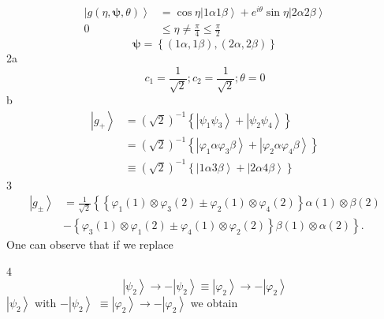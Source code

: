 \documentclass[aps,preprint]{revtex4}%
\begin{document}
\begin{align*}
\left\vert g\left(  \eta,\mathbf{\psi,}\theta\right)  \right\rangle  &
=\cos\eta\left\vert 1\alpha1\beta\right\rangle +e^{i\theta}\sin\eta\left\vert
2\alpha2\beta\right\rangle \\
0  &  \leq\eta\neq\frac{\pi}{4}\leq\frac{\pi}{2}%
\end{align*}%
\[
\mathbf{\psi}=\left\{  \left(  1\alpha,1\beta\right)  ,\left(  2\alpha
,2\beta\right)  \right\}
\]
2a%
\[
c_{1}=\frac{1}{\sqrt{2}};c_{2}=\frac{1}{\sqrt{2}};\theta=0
\]
b%
\begin{align*}
\left\vert g_{+}\right\rangle  &  =\left(  \sqrt{2}\right)  ^{-1}\left\{
\left\vert \psi_{1}\psi_{3}\right\rangle +\left\vert \psi_{2}\psi
_{4}\right\rangle \right\} \\
&  =\left(  \sqrt{2}\right)  ^{-1}\left\{  \left\vert \varphi_{1}\alpha
\varphi_{3}\beta\right\rangle +\left\vert \varphi_{2}\alpha\varphi_{4}%
\beta\right\rangle \right\} \\
&  \equiv\left(  \sqrt{2}\right)  ^{-1}\left\{  \left\vert 1\alpha
3\beta\right\rangle +\left\vert 2\alpha4\beta\right\rangle \right\}
\end{align*}
3%
\begin{align*}
\left\vert g_{\pm}\right\rangle  &  =\frac{1}{\sqrt{2}}\left\{  \left\{
\varphi_{1}\left(  1\right)  \otimes\varphi_{3}\left(  2\right)  \pm
\varphi_{2}\left(  1\right)  \otimes\varphi_{4}\left(  2\right)  \right\}
\alpha\left(  1\right)  \otimes\beta\left(  2\right)  \right. \\
&  -\left.  \left\{  \varphi_{3}\left(  1\right)  \otimes\varphi_{1}\left(
2\right)  \pm\varphi_{4}\left(  1\right)  \otimes\varphi_{2}\left(  2\right)
\right\}  \beta\left(  1\right)  \otimes\alpha\left(  2\right)  \right\}  .
\end{align*}
One can observe that if we replace

4
\[
\left\vert \psi_{2}\right\rangle \rightarrow-\left\vert \psi_{2}\right\rangle
\equiv\left\vert \varphi_{2}\right\rangle \rightarrow-\left\vert \varphi
_{2}\right\rangle
\]
$\left\vert \psi_{2}\right\rangle $ with $-\left\vert \psi_{2}\right\rangle $
$\equiv\left\vert \varphi_{2}\right\rangle \rightarrow-\left\vert \varphi
_{2}\right\rangle $ we obtain
\end{document}
